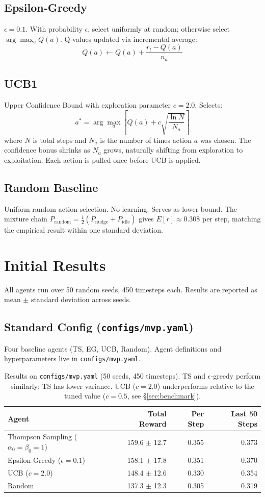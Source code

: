 \documentclass[11pt]{article}
\begin{document}
\subsection{Epsilon-Greedy}
$\epsilon = 0.1$. With probability $\epsilon$, select uniformly at random; otherwise select $\arg\max_a Q(a)$. Q-values updated via incremental average:
\[
Q(a) \leftarrow Q(a) + \frac{r_t - Q(a)}{n_a}
\]

\subsection{UCB1}
Upper Confidence Bound with exploration parameter $c = 2.0$. Selects:
\[
a^* = \arg\max_a \left[ Q(a) + c \sqrt{\frac{\ln N}{N_a}} \right]
\]
where $N$ is total steps and $N_a$ is the number of times action $a$ was chosen. The confidence bonus shrinks as $N_a$ grows, naturally shifting from exploration to exploitation. Each action is pulled once before UCB is applied.

\subsection{Random Baseline}
Uniform random action selection. No learning. Serves as lower bound.
The mixture chain $P_{\text{random}} = \tfrac{1}{2}(P_{\text{nudge}} + P_{\text{idle}})$ gives $E[r] \approx 0.308$ per step, matching the empirical result within one standard deviation.

\section{Initial Results}

All agents run over 50 random seeds, 450 timesteps each. Results are reported as mean $\pm$ standard deviation across seeds.

\subsection{Standard Config (\texttt{configs/mvp.yaml})}
Four baseline agents (TS, EG, UCB, Random). Agent definitions and hyperparameters live in \texttt{configs/mvp.yaml}.

\begin{table}[h]
\centering
\begin{tabular}{lrrr}
\toprule
Agent & Total Reward & Per Step & Last 50 Steps \\
\midrule
Thompson Sampling ($\alpha_0=\beta_0=1$) & 159.6 $\pm$ 12.7 & 0.355 & 0.373 \\
Epsilon-Greedy ($\epsilon=0.1$) & 158.1 $\pm$ 17.8 & 0.351 & 0.370 \\
UCB ($c=2.0$) & 148.4 $\pm$ 12.6 & 0.330 & 0.354 \\
Random & 137.3 $\pm$ 12.3 & 0.305 & 0.319 \\
\bottomrule
\end{tabular}
\caption{Results on \texttt{configs/mvp.yaml} (50 seeds, 450 timesteps). TS and $\epsilon$-greedy perform similarly; TS has lower variance. UCB ($c=2.0$) underperforms relative to the tuned value ($c=0.5$, see \S\ref{sec:benchmark}).}
\end{table}
\end{document}
